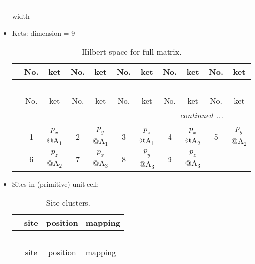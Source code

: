 \documentclass[fleqn,10pt,landscape]{article}
\begin{document}
\begin{itemize}
 \hfil \hrule height 1mm width \textwidth \hfil

\item Kets: dimension = 9
\begin{center}
\renewcommand{\arraystretch}{1.3}
\begin{longtable}{c|cc|cc|cc|cc|cc}
\caption{Hilbert space for full matrix.}
 \\
 \hline \hline
 & No. & ket & No. & ket & No. & ket & No. & ket & No. & ket \\ \hline \endfirsthead

\multicolumn{10}{l}{\tablename\ \thetable{}} \\
 \hline \hline
 & No. & ket & No. & ket & No. & ket & No. & ket & No. & ket \\ \hline \endhead

 \hline \hline
\multicolumn{10}{r}{\footnotesize\it continued ...} \\ \endfoot

 \hline \hline
\multicolumn{10}{r}{} \\ \endlastfoot

 & 1 & $p_{x}$@A$_{1}$ & 2 & $p_{y}$@A$_{1}$ & 3 & $p_{z}$@A$_{1}$ & 4 & $p_{x}$@A$_{2}$ & 5 & $p_{y}$@A$_{2}$ \\
& 6 & $p_{z}$@A$_{2}$ & 7 & $p_{x}$@A$_{3}$ & 8 & $p_{y}$@A$_{3}$ & 9 & $p_{z}$@A$_{3}$ &  &  \\
\end{longtable}
\end{center}

\item Sites in (primitive) unit cell:
\begin{center}
\renewcommand{\arraystretch}{1.3}
\begin{longtable}{cc|c|l}
\caption{Site-clusters.}
 \\
 \hline \hline
 & site & position & mapping \\ \hline \endfirsthead

\multicolumn{3}{l}{\tablename\ \thetable{}} \\
 \hline \hline
 & site & position & mapping \\ \hline \endhead


\end{longtable}
\end{center}
\end{itemize}
\end{document}
